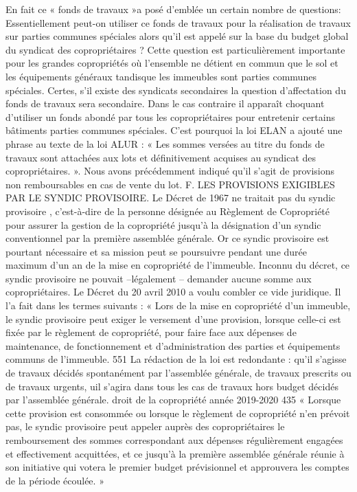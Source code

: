 En fait ce « fonds de travaux »a posé d’emblée un certain nombre de questions: Essentiellement peut-on utiliser ce fonds de travaux pour la réalisation de travaux sur parties communes spéciales alors qu’il est appelé sur la base du budget global du syndicat des copropriétaires ? Cette question est particulièrement importante pour les grandes copropriétés où l’ensemble ne détient en commun que le sol et les équipements généraux tandisque les immeubles sont parties communes spéciales. Certes, s’il existe des syndicats secondaires la question d’affectation du fonds de travaux sera secondaire. Dans le cas contraire il apparaît choquant d’utiliser un fonds abondé par tous les copropriétaires pour entretenir certains bâtiments parties communes spéciales. C’est pourquoi la loi ELAN a ajouté une phrase au texte de la loi ALUR : « Les sommes versées au titre du fonds de travaux sont attachées aux lots et définitivement acquises au syndicat des copropriétaires. ».
Nous avons précédemment indiqué qu’il s’agit de provisions non remboursables en cas de vente du lot.
F. LES PROVISIONS EXIGIBLES PAR LE SYNDIC PROVISOIRE.
Le Décret de 1967 ne traitait pas du syndic provisoire , c'est-à-dire de la personne désignée au Règlement de Copropriété pour assurer la gestion de la copropriété jusqu’à la désignation d’un syndic conventionnel par la première assemblée générale.
Or ce syndic provisoire est pourtant nécessaire et sa mission peut se poursuivre pendant une durée maximum d’un an de la mise en copropriété de l’immeuble.
Inconnu du décret, ce syndic provisoire ne pouvait –légalement – demander aucune somme aux copropriétaires. Le Décret du 20 avril 2010 a voulu combler ce vide juridique. Il l’a fait dans les termes suivants :
« Lors de la mise en copropriété d’un immeuble, le syndic provisoire peut exiger le versement d’une provision, lorsque celle-ci est fixée par le règlement de copropriété, pour faire face aux dépenses de maintenance, de fonctionnement et d’administration des parties et équipements communs de l’immeuble.
551 La rédaction de la loi est redondante : qu’il s’agisse de travaux décidés spontanément par l’assemblée générale, de travaux prescrits ou de travaux urgents, uil s’agira dans tous les cas de travaux hors budget décidés par l’assemblée générale.
droit de la copropriété année 2019-2020
435
« Lorsque cette provision est consommée ou lorsque le règlement de copropriété n’en prévoit pas, le syndic provisoire peut appeler auprès des copropriétaires le remboursement des sommes correspondant aux dépenses régulièrement engagées et effectivement acquittées, et ce jusqu’à la première assemblée générale réunie à son initiative qui votera le premier budget prévisionnel et approuvera les comptes de la période écoulée. »
